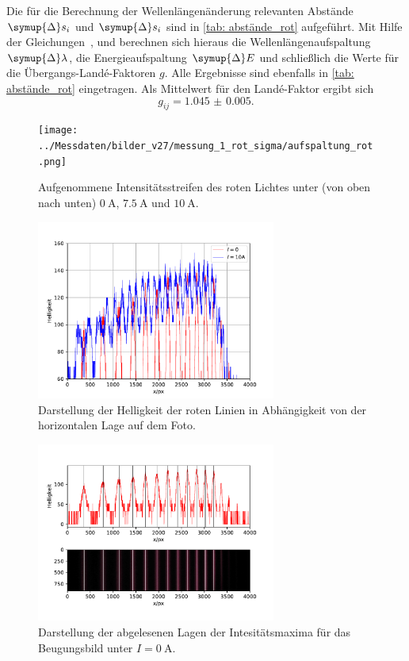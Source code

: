 Die für die Berechnung der Wellenlängenänderung relevanten Abstände $\symup{\Delta} s_i$ und $\symup{\Delta} s_i$ sind in \autoref{tab: abstände_rot}
aufgeführt. Mit Hilfe der Gleichungen~\label{eq: wellen_änderung}, \label{eq:energie_diff} und \label{eq: uebergangs_lande}
berechnen sich hieraus die Wellenlängenaufspaltung $\symup{\Delta} \lambda$, die
Energieaufspaltung $\symup{\Delta} E$ und schließlich die Werte für die Übergangs-Landé-Faktoren $g$. Alle Ergebnisse sind ebenfalls in
\autoref{tab: abstände_rot} eingetragen. Als Mittelwert für den Landé-Faktor ergibt sich
\begin{equation}
  g_{ij} = \num{1.045(5)}.
\end{equation}
\begin{figure}
  \centering
  \texttt{[image: ../Messdaten/bilder\_v27/messung\_1\_rot\_sigma/aufspaltung\_rot.png]}
  \caption{Aufgenommene Intensitätsstreifen des roten Lichtes unter (von oben nach unten) $\SI{0}{\ampere}$, $\SI{7.5}{\ampere}$ und $\SI{10}{\ampere}$.}
  \label{fig: aufspaltung_rot}
\end{figure}
\begin{figure}
  \centering
  \includegraphics[width = 0.7\textwidth]{../Messdaten/plots/rot_sigma_intensitaet.pdf}
  \caption{Darstellung der Helligkeit der roten Linien in Abhängigkeit von der horizontalen Lage auf dem Foto.}
  \label{fig: rot_intensität}
\end{figure}

\begin{figure}
  \centering
  \includegraphics[width = 0.7\textwidth]{../Messdaten/plots/peaks_rot_sigma_0.pdf}
  \caption{Darstellung der abgelesenen Lagen der Intesitätsmaxima für das Beugungsbild unter $I =\SI{0}{\ampere}$.}
  \label{fig: peaks_rot_0}
\end{figure}
